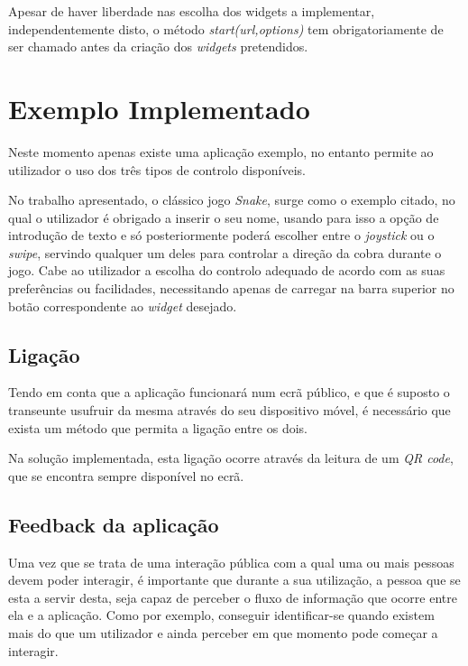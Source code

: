 	Apesar de haver liberdade nas escolha dos widgets a implementar, independentemente disto, o método \textit{start(url,options)} tem obrigatoriamente de ser chamado antes da criação dos \textit{widgets} pretendidos. 


	
\section{Exemplo Implementado} \label{sec:exemplo}

	Neste momento apenas existe uma aplicação exemplo, no entanto permite ao utilizador o uso dos três tipos de controlo disponíveis. 

	No trabalho apresentado, o clássico jogo \textit{Snake}, surge como o exemplo citado, no qual o utilizador é obrigado a inserir o seu nome, usando para isso a opção de introdução de texto e só posteriormente poderá escolher entre o \textit{joystick} ou o \textit{swipe}, servindo qualquer um deles para controlar a direção da cobra durante o jogo. Cabe ao utilizador a escolha do controlo adequado de acordo com as suas preferências ou facilidades, necessitando apenas de carregar na barra superior no botão correspondente ao \textit{widget} desejado.

	\subsection{Ligação}

	Tendo em conta que a aplicação funcionará num ecrã público, e que é suposto o transeunte usufruir da mesma através do seu dispositivo móvel, é necessário que exista um método que permita a ligação entre os dois.

	Na solução implementada, esta ligação ocorre através da leitura de um \textit{QR code}, que se encontra sempre disponível no ecrã.

	\subsection{Feedback da aplicação}

	Uma vez que se trata de uma interação pública com a qual uma ou mais pessoas devem poder interagir, é importante que durante a sua utilização, a pessoa que se esta a servir desta, seja capaz de perceber o fluxo de informação que ocorre entre ela e a aplicação. Como por exemplo, conseguir identificar-se quando existem mais do que um utilizador e ainda perceber em que momento pode começar a interagir.

